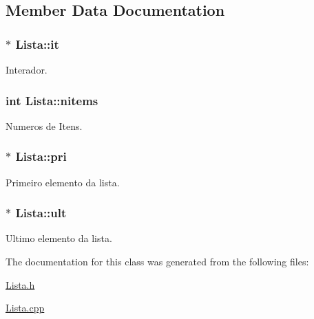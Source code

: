 \subsection{Member Data Documentation}
\hypertarget{class_lista_a2e5f3aba3731dfddf41016ade510d3aa}{
\subsubsection[{it}]{$\ast$ Lista\-::it\hspace{0.3cm}{\ttfamily [protected]}}}\label{class_lista_a2e5f3aba3731dfddf41016ade510d3aa}


Interador. 

\hypertarget{class_lista_a6d17539dfc71dde4df05343fcfefb8b0}{
\subsubsection[{nitems}]{\setlength{\rightskip}{0pt plus 5cm}int Lista\-::nitems\hspace{0.3cm}{\ttfamily [protected]}}}\label{class_lista_a6d17539dfc71dde4df05343fcfefb8b0}


Numeros de Itens. 

\hypertarget{class_lista_a7c35eadb33738c21dad896e957eff430}{
\subsubsection[{pri}]{$\ast$ Lista\-::pri\hspace{0.3cm}{\ttfamily [protected]}}}\label{class_lista_a7c35eadb33738c21dad896e957eff430}


Primeiro elemento da lista. 

\hypertarget{class_lista_a89bce7d87b5cd06297851d19d9be4a10}{
\subsubsection[{ult}]{$\ast$ Lista\-::ult\hspace{0.3cm}{\ttfamily [protected]}}}\label{class_lista_a89bce7d87b5cd06297851d19d9be4a10}


Ultimo elemento da lista. 



The documentation for this class was generated from the following files\-:\begin{DoxyCompactItemize}
\item 
\hyperlink{_lista_8h}{Lista.\-h}\item 
\hyperlink{_lista_8cpp}{Lista.\-cpp}\end{DoxyCompactItemize}
